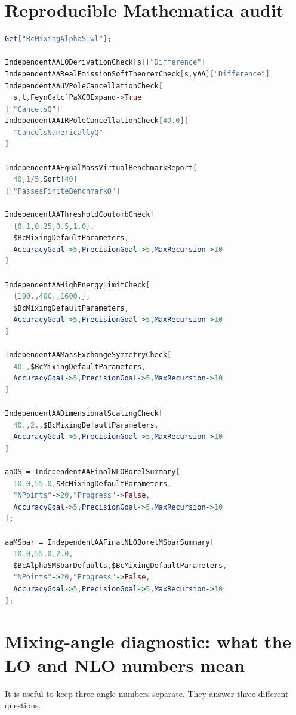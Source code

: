 \documentclass[11pt]{article}
\begin{document}
\section{Reproducible Mathematica audit}

\begin{lstlisting}[language=Mathematica]
Get["BcMixingAlphaS.wl"];

IndependentAALODerivationCheck[s]["Difference"]
IndependentAARealEmissionSoftTheoremCheck[s,yAA]["Difference"]
IndependentAAUVPoleCancellationCheck[
  s,l,FeynCalc`PaXC0Expand->True
]["CancelsQ"]
IndependentAAIRPoleCancellationCheck[40.0][
  "CancelsNumericallyQ"
]

IndependentAAEqualMassVirtualBenchmarkReport[
  40,1/5,Sqrt[40]
]["PassesFiniteBenchmarkQ"]

IndependentAAThresholdCoulombCheck[
  {0.1,0.25,0.5,1.0},
  $BcMixingDefaultParameters,
  AccuracyGoal->5,PrecisionGoal->5,MaxRecursion->10
]

IndependentAAHighEnergyLimitCheck[
  {100.,400.,1600.},
  $BcMixingDefaultParameters,
  AccuracyGoal->5,PrecisionGoal->5,MaxRecursion->10
]

IndependentAAMassExchangeSymmetryCheck[
  40.,$BcMixingDefaultParameters,
  AccuracyGoal->5,PrecisionGoal->5,MaxRecursion->10
]

IndependentAADimensionalScalingCheck[
  40.,2.,$BcMixingDefaultParameters,
  AccuracyGoal->5,PrecisionGoal->5,MaxRecursion->10
]

aaOS = IndependentAAFinalNLOBorelSummary[
  10.0,55.0,$BcMixingDefaultParameters,
  "NPoints"->20,"Progress"->False,
  AccuracyGoal->5,PrecisionGoal->5,MaxRecursion->10
];

aaMSbar = IndependentAAFinalNLOBorelMSbarSummary[
  10.0,55.0,2.0,
  $BcAlphaSMSbarDefaults,$BcMixingDefaultParameters,
  "NPoints"->20,"Progress"->False,
  AccuracyGoal->5,PrecisionGoal->5,MaxRecursion->10
];
\end{lstlisting}

\section{Mixing-angle diagnostic: what the LO and NLO numbers mean}

It is useful to keep three angle numbers separate.  They answer three
different questions.
\end{document}
